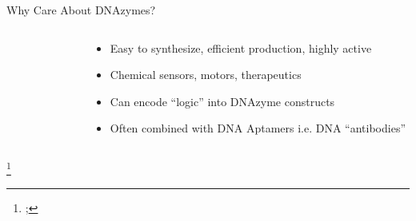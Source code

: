 \documentclass[aspectratio=43]{beamer}
\newcommand\blfootnote[1]{%
    \begingroup
    \renewcommand\thefootnote{}\footnote{#1}%
    \addtocounter{footnote}{-1}%
    \endgroup
}
\begin{document}
\begin{frame}[fragile]{Why Care About DNAzymes?}
\begin{columns}
    \begin{column}{0.5\textwidth}
        \begin{figure}[htb!]
        \end{figure}
    \end{column}
    \begin{column}{0.5\textwidth}
        \begin{itemize}
            \item<2-> Easy to synthesize, efficient production, highly active
            \item<3-> Chemical sensors, motors, therapeutics
            \item<4-> Can encode “logic” into DNAzyme constructs
            \item<5-> Often combined with DNA Aptamers i.e. DNA “antibodies”
        \end{itemize}
    \end{column}
\end{columns}
\blfootnote{\cite{apps};\cite{apps2}}
\end{frame}
\end{document}
